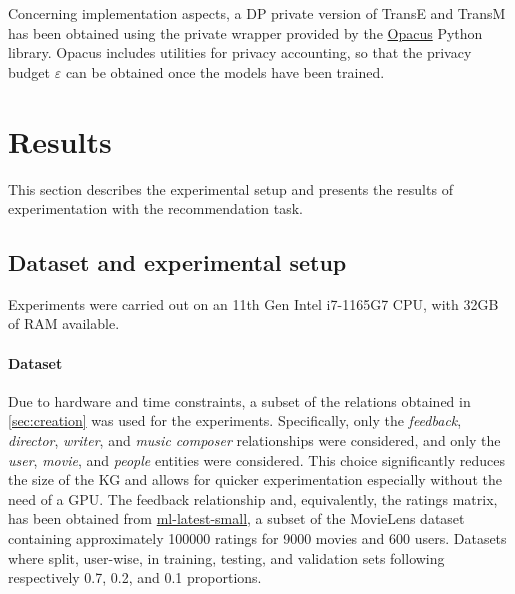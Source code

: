 Concerning implementation aspects, a DP private version of TransE and TransM has been obtained using the private wrapper provided by the \href{https://opacus.ai/}{Opacus} Python library.
Opacus includes utilities for privacy accounting, so that the privacy budget $\varepsilon$ can be obtained once the models have been trained.





\section{Results}
This section describes the experimental setup and presents the results of experimentation with the recommendation task.

\subsection{Dataset and experimental setup}

Experiments were carried out on an 11th Gen Intel i7-1165G7 CPU, with 32GB of RAM available.

\paragraph{Dataset} Due to hardware and time constraints, a subset of the relations obtained in \cref{sec:creation} was used for the experiments.
Specifically, only the \emph{feedback}, \emph{director}, \emph{writer}, and \emph{music composer} relationships were considered, and only the \emph{user}, \emph{movie}, and \emph{people} entities were considered.
This choice significantly reduces the size of the KG and allows for quicker experimentation especially without the need of a GPU.
The feedback relationship and, equivalently, the ratings matrix, has been obtained from \href{https://grouplens.org/datasets/movielens/latest/}{ml-latest-small}, a subset of the MovieLens dataset containing approximately \num{100000} ratings for \num{9000} movies and \num{600} users.
Datasets where split, user-wise, in training, testing, and validation sets following respectively \num{0.7}, \num{0.2}, and \num{0.1} proportions.


